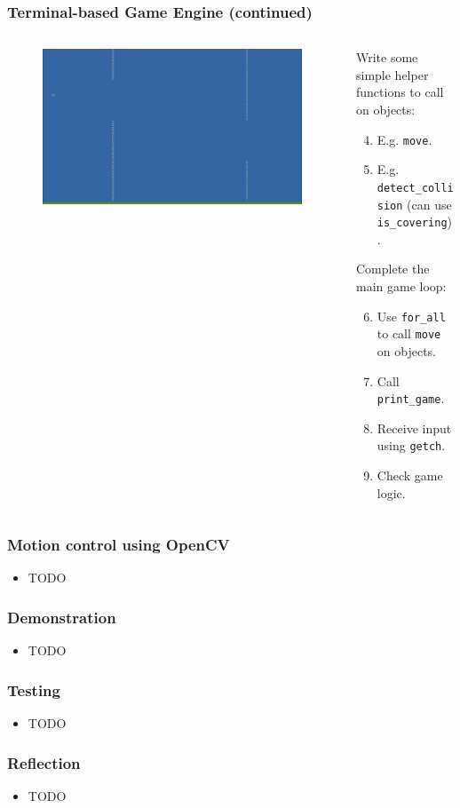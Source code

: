 \documentclass{beamer}
\begin{document}
\begin{frame}
\frametitle{Terminal-based Game Engine (continued)}
\begin{columns}
	\begin{column}{0.55\textwidth}
		\begin{figure}
			\includegraphics[width=\textwidth]{Presentation/flappy.png}
		\end{figure}
	\end{column}
	\begin{column}{0.45\textwidth}
		Write some simple helper functions to call on objects:
		\begin{enumerate}
			\setcounter{enumi}{3}
			\item E.g. \texttt{move}.
			\item E.g. \texttt{detect\_collision} (can use \texttt{is\_covering}).
		\end{enumerate}
		Complete the main game loop:
		\begin{enumerate}
			\setcounter{enumi}{5}
			\item Use \texttt{for\_all} to call \texttt{move} on objects.
			\item Call \texttt{print\_game}.
			\item Receive input using \texttt{getch}.
			\item Check game logic.
		\end{enumerate}
	\end{column}
\end{columns}
\end{frame}

\begin{frame}
\frametitle{Motion control using OpenCV}
\begin{itemize}
	\item TODO
\end{itemize}
\end{frame}

\begin{frame}
\frametitle{Demonstration}
\begin{itemize}
	\item TODO
\end{itemize}
\end{frame}

\begin{frame}
\frametitle{Testing}
\begin{itemize}
	\item TODO
\end{itemize}
\end{frame}

\begin{frame}
\frametitle{Reflection}
\begin{itemize}
	\item TODO
\end{itemize}
\end{frame}
\end{document}
